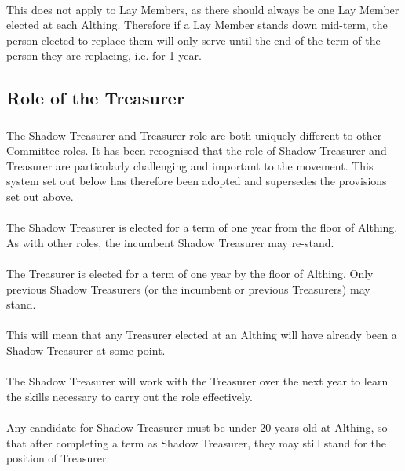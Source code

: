 \documentclass[a4paper, 12pt]{report}
\begin{document}
\paragraph{} This does not apply to Lay Members, as there should always be one Lay Member elected at each Althing. Therefore if a Lay Member stands down mid-term, the person elected to replace them will only serve until the end of the term of the person they are replacing, i.e. for 1 year.

\subsection{Role of the Treasurer}
\label{sec:treasurerrole}
\subsubsection{}
The Shadow Treasurer and Treasurer role are both uniquely different to other Committee roles. It has been recognised that the role of Shadow Treasurer and Treasurer are particularly challenging and important to the movement. This system set out below has therefore been adopted and supersedes the provisions set out above.
\paragraph{}
The Shadow Treasurer is elected for a term of one year from the floor of Althing. As with other roles, the incumbent Shadow Treasurer may re-stand.
\paragraph{}
The Treasurer is elected for a term of one year by the floor of Althing. Only previous Shadow Treasurers (or the incumbent or previous Treasurers) may stand.
\paragraph{}
This will mean that any Treasurer elected at an Althing will have already been a Shadow Treasurer at some point.
\paragraph{}
The Shadow Treasurer will work with the Treasurer over the next year to learn the skills necessary to carry out the role effectively.
\paragraph{}
Any candidate for Shadow Treasurer must be under 20 years old at Althing, so that after completing a term as Shadow Treasurer, they may still stand for the position of Treasurer.
\end{document}
